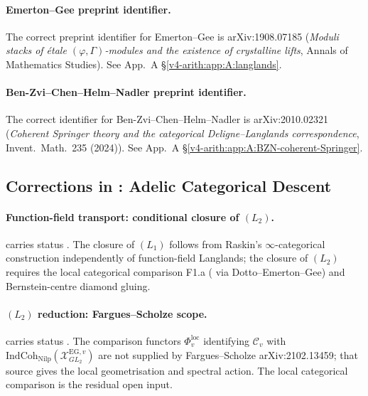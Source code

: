 \paragraph{Emerton--Gee preprint identifier.}
The correct preprint identifier for Emerton--Gee is arXiv:1908.07185
(\emph{Moduli stacks of \'etale \((\varphi,\Gamma)\)-modules and the
existence of crystalline lifts}, Annals of Mathematics Studies).
See App.~A \S\ref{v4-arith:app:A:langlands}.

\paragraph{Ben-Zvi--Chen--Helm--Nadler preprint identifier.}
The correct identifier for Ben-Zvi--Chen--Helm--Nadler is
arXiv:2010.02321 (\emph{Coherent Springer theory and the categorical
Deligne--Langlands correspondence}, Invent.~Math.~235 (2024)).
See App.~A \S\ref{v4-arith:app:A:BZN-coherent-Springer}.

\subsection{Corrections in : Adelic Categorical Descent}
\label{v4-arith:w3-audit-A:ch27}

\paragraph{Function-field transport: conditional closure of \((L_2)\).}
 carries status
\ClaimStatusNeedsVerification. The closure of \((L_{1})\) follows
from Raskin's \(\infty\)-categorical construction independently of
function-field Langlands; the closure of \((L_{2})\) requires the
local categorical comparison F1.a (\ClaimStatusNeedsVerification
via Dotto--Emerton--Gee) and Bernstein-centre diamond gluing.

\paragraph{\((L_2)\) reduction: Fargues--Scholze scope.}
 carries status
\ClaimStatusNeedsVerification. The comparison functors
\(\Phi^{\mathrm{loc}}_{v}\) identifying \(\mathcal{C}_{v}\) with
\(\mathrm{IndCoh}_{\mathrm{Nilp}}(\mathcal{X}^{\mathrm{EG},v}_{GL_{2}})\)
are not supplied by Fargues--Scholze arXiv:2102.13459; that source
gives the local geometrisation and spectral action. The local
categorical comparison is the residual open input.

